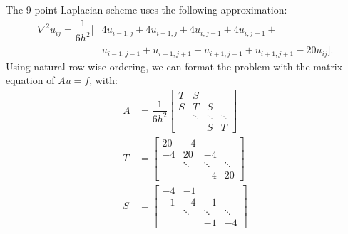 \documentclass[11pt]{article}
\begin{document}
\maketitle
\pagebreak

\section{}

\section{}
\subsection{}
The 9-point Laplacian scheme uses the following approximation:
\begin{equation}\begin{split}
\nabla^2u_{ij} = \dfrac1{6h^2}[&4u_{i-1,j}+4u_{i+1,j}+4u_{i,j-1}+4u_{i,j+1}+\\
                               &u_{i-1,j-1}+u_{i-1,j+1}+u_{i+1,j-1}+u_{i+1,j+1}-20u_{ij}].
\end{split}\end{equation} 
Using natural row-wise ordering, we can format the problem with the matrix equation of $Au=f$, with:
\begin{equation}\begin{split}
A &= \dfrac1{6h^2}\begin{bmatrix}
T & S \\
S & T & S \\
  & \ddots & \ddots & \ddots \\
  & &  S& T
\end{bmatrix} \\
T &= \begin{bmatrix}
20 & -4 \\
-4 & 20 & -4 \\
 & \ddots & \ddots & \ddots \\
 & & -4 & 20
\end{bmatrix} \\
S & = \begin{bmatrix}
-4 & -1 \\
-1 &-4 &-1\\
& \ddots &\ddots &\ddots \\
   && -1 & -4
\end{bmatrix} 
\end{split}\end{equation}
\end{document}
